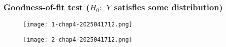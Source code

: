 \subsubsection{Goodness-of-fit test (\texorpdfstring{$H_0:$}{H_0:} \texorpdfstring{$Y$}{Y} satisfies some distribution)}

\begin{figure}[H]
\centering
\texttt{[image: 1-chap4-2025041712.png]}
\label{}
\end{figure}
\begin{figure}[H]
\centering
\texttt{[image: 2-chap4-2025041712.png]}
\label{}
\end{figure}
